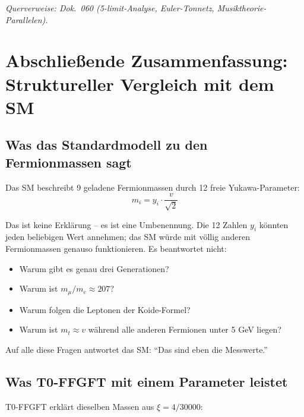 \noindent\textit{Querverweise: Dok.~060 (5-limit-Analyse, Euler-Tonnetz,
Musiktheorie-Parallelen).}

\section{Abschließende Zusammenfassung: Struktureller Vergleich mit dem SM}

\subsection{Was das Standardmodell zu den Fermionmassen sagt}

Das SM beschreibt 9 geladene Fermionmassen durch 12 freie
Yukawa-Parameter:
\begin{equation}
    m_i = y_i \cdot \frac{v}{\sqrt{2}}
\end{equation}

Das ist keine Erklärung -- es ist eine Umbenennung. Die 12 Zahlen
$y_i$ könnten jeden beliebigen Wert annehmen; das SM würde mit
völlig anderen Fermionmassen genauso funktionieren. Es beantwortet
nicht:
\begin{itemize}
    \item Warum gibt es genau drei Generationen?
    \item Warum ist $m_\mu/m_e \approx 207$?
    \item Warum folgen die Leptonen der Koide-Formel?
    \item Warum ist $m_t \approx v$ während alle anderen Fermionen
          unter 5 GeV liegen?
\end{itemize}

Auf alle diese Fragen antwortet das SM: ``Das sind eben die Messwerte.''

\subsection{Was T0-FFGFT mit einem Parameter leistet}

T0-FFGFT erklärt dieselben Massen aus $\xi = 4/30000$:

